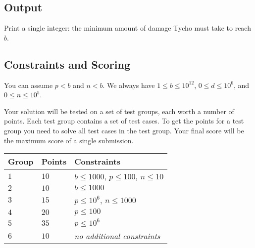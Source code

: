 \subsection*{Output}

Print a single integer: the minimum amount of damage Tycho must take to reach $b$.

\subsection*{Constraints and Scoring}

You can assume
$p < b$ %
and
$n < b$. %
We always have
$1\leq b\leq 10^{12}$, %
$0\leq d \leq 10^6$, %
and
$0\leq n \leq 10^5$. %

Your solution will be tested on a set of test groups, each worth a number of points.
Each test group contains a set of test cases.
To get the points for a test group you need to solve all test cases in the test group.
Your final score will be the maximum score of a single submission.

\medskip
\begin{tabular}{lll}
Group & Points & Constraints \\\hline
  $1$ & $10$ & $b\leq 1000$, $p\leq 100$, $n\leq 10$ \\
  $2$ & $10$ & $b\leq 1000$ \\
  $3$ & $15$ & $p\leq 10^6$, $n\leq 1000$\\
  $4$ & $20$ & $p\leq 100$\\
  $5$ & $35$ & $p\leq 10^6$\\
  $6$ & $10$ & \emph{no additional constraints}
\end{tabular}
